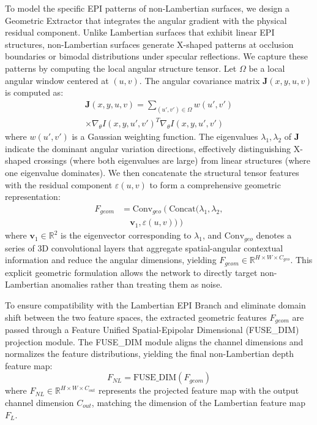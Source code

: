 \documentclass[lettersize,journal]{IEEEtran}
\begin{document}
To model the specific EPI patterns of non-Lambertian surfaces, we design a Geometric Extractor that integrates the angular gradient with the physical residual component. Unlike Lambertian surfaces that exhibit linear EPI structures, non-Lambertian surfaces generate X-shaped patterns at occlusion boundaries or bimodal distributions under specular reflections. We capture these patterns by computing the local angular structure tensor. Let $\Omega$ be a local angular window centered at $(u,v)$. The angular covariance matrix $\mathbf{J}(x,y,u,v)$ is computed as:
\begin{multline}
\mathbf{J}(x,y,u,v) = \sum_{(u',v') \in \Omega} w(u',v') \\
\times \nabla_{\theta} I(x,y,u',v')^T \nabla_{\theta} I(x,y,u',v')
\end{multline}
where $w(u',v')$ is a Gaussian weighting function. The eigenvalues $\lambda_1, \lambda_2$ of $\mathbf{J}$ indicate the dominant angular variation directions, effectively distinguishing X-shaped crossings (where both eigenvalues are large) from linear structures (where one eigenvalue dominates). We then concatenate the structural tensor features with the residual component $\varepsilon(u,v)$ to form a comprehensive geometric representation:
\begin{equation}
\begin{aligned}
F_{geom} &= \text{Conv}_{geo} \left( \text{Concat}(\lambda_1, \lambda_2, \right. \\
&\quad \left. \mathbf{v}_1, \varepsilon(u,v)) \right)
\end{aligned}
\end{equation}
where $\mathbf{v}_1 \in \mathbb{R}^2$ is the eigenvector corresponding to $\lambda_1$, and $\text{Conv}_{geo}$ denotes a series of 3D convolutional layers that aggregate spatial-angular contextual information and reduce the angular dimensions, yielding $F_{geom} \in \mathbb{R}^{H \times W \times C_{geo}}$. This explicit geometric formulation allows the network to directly target non-Lambertian anomalies rather than treating them as noise.

To ensure compatibility with the Lambertian EPI Branch and eliminate domain shift between the two feature spaces, the extracted geometric features $F_{geom}$ are passed through a Feature Unified Spatial-Epipolar Dimensional (FUSE\_DIM) projection module. The FUSE\_DIM module aligns the channel dimensions and normalizes the feature distributions, yielding the final non-Lambertian depth feature map:
\begin{equation}
F_{NL} = \text{FUSE\_DIM}(F_{geom})
\end{equation}
where $F_{NL} \in \mathbb{R}^{H \times W \times C_{out}}$ represents the projected feature map with the output channel dimension $C_{out}$, matching the dimension of the Lambertian feature map $F_L$.
\end{document}
